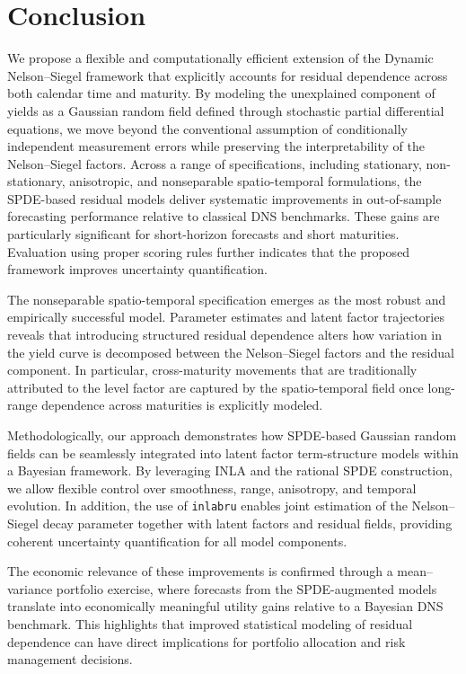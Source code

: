 \documentclass[
  12pt]{article}
\begin{document}
\section{Conclusion}\label{sec:conclusion}
We propose a flexible and computationally efficient extension of the Dynamic Nelson–Siegel framework that explicitly accounts for residual dependence across both calendar time and maturity. By modeling the unexplained component of yields as a Gaussian random field defined through stochastic partial differential equations, we move beyond the conventional assumption of conditionally independent measurement errors while preserving the interpretability of the Nelson–Siegel factors. Across a range of specifications, including stationary, non-stationary, anisotropic, and nonseparable spatio-temporal formulations, the SPDE-based residual models deliver systematic improvements in out-of-sample forecasting performance relative to classical DNS benchmarks. These gains are particularly significant for short-horizon forecasts and short maturities. Evaluation using proper scoring rules further indicates that the proposed framework improves uncertainty quantification.

The nonseparable spatio-temporal specification emerges as the most robust and empirically successful model. Parameter estimates and latent factor trajectories reveals that introducing structured residual dependence alters how variation in the yield curve is decomposed between the Nelson–Siegel factors and the residual component. In particular, cross-maturity movements that are traditionally attributed to the level factor are captured by the spatio-temporal field once long-range dependence across maturities is explicitly modeled. 

Methodologically, our approach demonstrates how SPDE-based Gaussian random fields can be seamlessly integrated into latent factor term-structure models within a Bayesian framework. By leveraging INLA and the rational SPDE construction, we allow flexible control over smoothness, range, anisotropy, and temporal evolution. In addition, the use of \texttt{inlabru} enables joint estimation of the Nelson–Siegel decay parameter together with latent factors and residual fields, providing coherent uncertainty quantification for all model components.

The economic relevance of these improvements is confirmed through a mean–variance portfolio exercise, where forecasts from the SPDE-augmented models translate into economically meaningful utility gains relative to a Bayesian DNS benchmark. This highlights that improved statistical modeling of residual dependence can have direct implications for portfolio allocation and risk management decisions.
\end{document}
